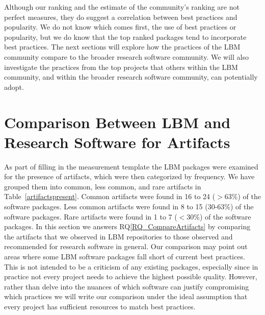 \documentclass[final, 3p, times, authoryear]{elsarticle}
\newcommand{\rqref}[1]{RQ\ref{#1}}
\begin{document}
Although our ranking and the estimate of the community's ranking are not perfect
measures, they do suggest a correlation between best practices and popularity.
We do not know which comes first, the use of best practices or popularity, but
we do know that the top ranked packages tend to incorporate best practices.  The
next sections will explore how the practices of the LBM community compare to the
broader research software community.  We will also investigate the practices
from the top projects that others within the LBM community, and within the
broader research software community, can potentially adopt.

\section{Comparison Between LBM and Research Software for Artifacts}
\label{Sec_CompareArtifacts}

As part of filling in the measurement template the LBM packages were examined
for the presence of artifacts, which were then categorized by frequency. We have
grouped them into common, less common, and rare artifacts in
Table~\ref{artifactspresent}. Common artifacts were found in 16 to 24 ($>$63\%)
of the software packages. Less common artifacts were found in 8 to 15 (30-63\%)
of the software packages. Rare artifacts were found in 1 to 7 ($<$30\%) of the
software packages.  In this section we answers \rqref{RQ_CompareArtifacts} by
comparing the artifacts that we observed in LBM repositories to those observed
and recommended for research software in general. Our comparison may point out
areas where some LBM software packages fall short of current best practices.
This is not intended to be a criticism of any existing packages, especially
since in practice not every project needs to achieve the highest possible
quality.  However, rather than delve into the nuances of which software can
justify compromising which practices we will write our comparison under the
ideal assumption that every project has sufficient resources to match best
practices.
\end{document}
